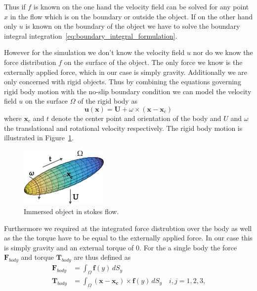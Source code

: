 \documentclass[a4paper,11pt]{kth-mag}
\begin{document}
Thus if $f$ is known on the one hand the velocity field can be solved for any point $x$ in the flow which is on the boundary or outside the object. If on the other hand only $u$ is known on the boundary of the object we have to solve the boundary integral integration~\eqref{eq:boundary_integral_formulation}.

However for the simulation we don't know the velocity field $u$ nor do we know the force distribution $f$ on the surface of the object. The only force we know is the externally applied force, which in our case is simply gravity. Additionally we are only concerned with rigid objects. Thus by combining the equations governing rigid body motion with the no-slip boundary condition we can model the velocity field $u$ on the surface $\Omega$ of the rigid body as
\begin{equation}
  \label{eq:rigid_body_motion}
  \mathbf{u}(\mathbf{x}) = \mathbf{U} + \omega \times (\mathbf{x} - \mathbf{x}_c)
\end{equation}
where $\mathbf{x}_c$ and $t$ denote the center point and orientation of the body and $U$ and $\omega$ the translational and rotational velocity respectively. The rigid body motion is illustrated in Figure~\ref{fig:immersed_rigid}.

\begin{figure}[!htbp]
  \centering
  \includegraphics[width=0.3819660112501450000000\textwidth]{img/immersed_rigid.pdf}
  \caption{Immersed object in stokes flow.}
  \label{fig:immersed_rigid}
\end{figure}

Furthermore we required at the integrated force distrubtion over the body as well as the the torque have to be equal to the externally applied force. In our case this is simply gravity and an external torque of $0$. For the a single body the force $\mathbf{F}_{body}$ and torque $\mathbf{T}_{body}$ are thus defined as
\begin{equation}
  \label{eq:force_torque}
  \begin{aligned}
    \mathbf{F}_{body} &= \int_\Omega \mathbf{f}(y) \, dS_y \\
    \mathbf{T}_{body} &= \int_\Omega (\mathbf{x} - \mathbf{x_c}) \times \mathbf{f}(y) \, dS_y \quad i,j=1,2,3\text{,}
  \end{aligned}
\end{equation}
\end{document}
